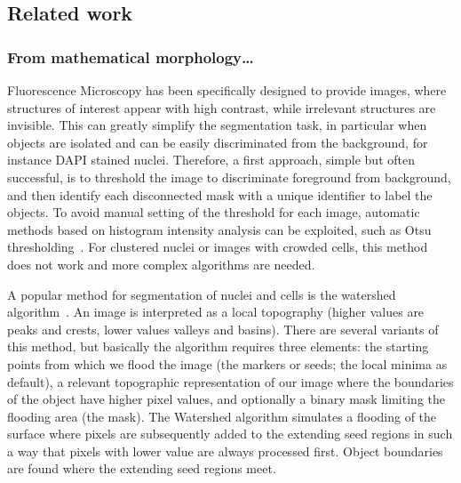 \subsection{Related work}
\label{subsec:segmentation_related_work}

\subsubsection{From mathematical morphology\dots}

Fluorescence Microscopy has been specifically designed to provide images, where structures of interest appear with high contrast, while irrelevant structures are invisible. This can greatly simplify the segmentation task, in particular when objects are isolated and can be easily discriminated from the background, for instance DAPI stained nuclei.
Therefore, a first approach, simple but often successful, is to threshold the image to discriminate foreground from background, and then identify each disconnected mask with a unique identifier to label the objects.
To avoid manual setting of the threshold for each image, automatic methods based on histogram intensity analysis can be exploited, such as Otsu thresholding~\cite{Otsu_1979}.
For clustered nuclei or images with crowded cells, this method does not work and more complex algorithms are needed.

A popular method for segmentation of nuclei and cells is the watershed algorithm~\cite{Beucher1979,Serra1983,Vincent_1991}.
An image is interpreted as a local topography (higher values are peaks and crests, lower values valleys and basins).
There are several variants of this method, but basically the algorithm requires three elements: the starting points from which we flood the image (the markers or seeds; the local minima as default), a relevant topographic representation of our image where the boundaries of the object have higher pixel values, and optionally a binary mask limiting the flooding area (the mask). The Watershed algorithm simulates a flooding of the surface where pixels are subsequently added to the extending seed regions in such a way that pixels with lower value are always processed first. Object boundaries are found where the extending seed regions meet. 


